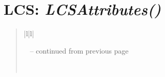 \documentclass[letterpaper,10pt,english]{sphinxmanual}
\begin{document}
\begin{DUlineblock}{0em}
\item[] 
\end{DUlineblock}

\begin{DUlineblock}{0em}
\item[] 
\end{DUlineblock}


\section{\textbf{LCS}: \emph{LCSAttributes()}}
\label{attributes:lcs-lcsattributes}
\begin{DUlineblock}{0em}
\item[] 
\end{DUlineblock}
\begin{quote}

\begin{longtable}{|l|l|}
\hline
\endfirsthead

%
{{\textsf{\tablename\ \thetable{} -- continued from previous page}}} \\
\hline
\endhead

\hline {} \\ \hline
\endfoot

\endlastfoot



\end{longtable}
\end{quote}
\end{document}
